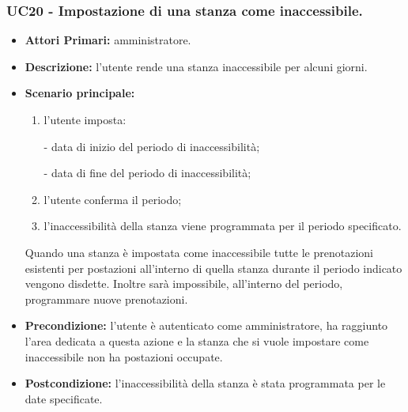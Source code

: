 \subsubsection{UC20 - Impostazione di una stanza come inaccessibile.}
\begin{itemize}
	\item\textbf{Attori Primari:}
	amministratore.
	\item\textbf{Descrizione:}
	l'utente rende una stanza inaccessibile per alcuni giorni.
	\item\textbf{Scenario principale:} 
	\begin{enumerate}
		\item l'utente imposta: %
			
				- data di inizio del periodo di inaccessibilità;
				
				- data di fine del periodo di inaccessibilità;
			
		\item l'utente conferma il periodo;
		\item l'inaccessibilità della stanza viene programmata per il periodo specificato.
	\end{enumerate}
	Quando una stanza è impostata come inaccessibile tutte le prenotazioni esistenti per postazioni all'interno di quella stanza durante il periodo indicato vengono disdette. Inoltre sarà impossibile, all'interno del periodo, programmare nuove prenotazioni.
	\item\textbf{Precondizione:} 
	l'utente è autenticato come amministratore, ha raggiunto l'area dedicata a questa azione e la stanza che si vuole impostare come inaccessibile non ha postazioni occupate.
	\item\textbf{Postcondizione:}
	l'inaccessibilità della stanza è stata programmata per le date specificate.
\end{itemize}

